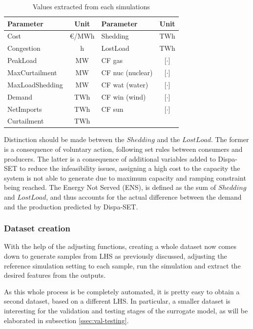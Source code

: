 \begin{table}[h]
    \centering
    \begin{tabular}{|l c|l c|}
		\hline
		Parameter & Unit & Parameter & Unit \\
		\hline
		Cost            & €/MWh & Shedding & TWh \\
		Congestion      & h     & LostLoad & TWh \\
		PeakLoad        & MW    & CF gas  & [$\cdot$] \\
		MaxCurtailment  & MW    & CF nuc (nuclear)  & [$\cdot$] \\
		MaxLoadShedding & MW    & CF wat (water)  & [$\cdot$] \\
		Demand          & TWh   & CF win (wind)  & [$\cdot$] \\
		NetImports      & TWh   & CF sun  & [$\cdot$] \\
		Curtailment     & TWh   &  &  \\
		\hline
	\end{tabular}
	\caption{Values extracted from each simulations}
	\label{table:values-extracted}
\end{table}

Distinction should be made between the $Shedding$ and the $LostLoad$. The former is a consequence of voluntary action, following set rules between consumers and producers. The latter is a consequence of additional variables added to Dispa-SET to reduce the infeasibility issues, assigning a high cost to the capacity the system is not able to generate due to maximum capacity and ramping constraint being reached. The Energy Not Served (ENS), is defined as the sum of $Shedding$ and $LostLoad$, and thus accounts for the actual difference between the demand and the production predicted by Dispa-SET.

\subsubsection{Dataset creation}

With the help of the adjusting functions, creating a whole dataset now comes down to generate samples from LHS as previously discussed, adjusting the reference simulation setting to each sample, run the simulation and extract the desired features from the outputs.

As this whole process is be completely automated, it is pretty easy to obtain a second dataset, based on a different LHS. In particular, a smaller dataset is interesting for the validation and testing stages of the surrogate model, as will be elaborated in subsection \ref{ssec:val-testing}.

